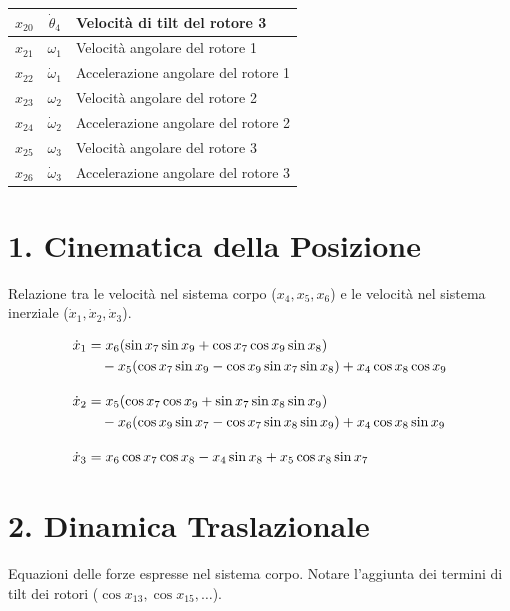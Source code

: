 \begin{table}[htbp]
\begin{tabular}{ccl}
        $x_{20}$ & $\dot{\theta}_4$ & Velocità di tilt del rotore 3 \\
        \midrule
        $x_{21}$ & $\omega_1$ & Velocità angolare del rotore 1 \\
        $x_{22}$ & $\dot{\omega}_1$ & Accelerazione angolare del rotore 1 \\
        $x_{23}$ & $\omega_2$ & Velocità angolare del rotore 2 \\
        $x_{24}$ & $\dot{\omega}_2$ & Accelerazione angolare del rotore 2 \\
        $x_{25}$ & $\omega_3$ & Velocità angolare del rotore 3 \\
        $x_{26}$ & $\dot{\omega}_3$ & Accelerazione angolare del rotore 3 \\
        \bottomrule
    \end{tabular}
\end{table}

\section*{1. Cinematica della Posizione}
Relazione tra le velocità nel sistema corpo ($x_4, x_5, x_6$) e le velocità nel sistema inerziale ($\dot{x}_1, \dot{x}_2, \dot{x}_3$).

\begin{align}
\dot{x}_1 &= x_6 (\sin x_7 \sin x_9 + \cos x_7 \cos x_9 \sin x_8) \notag \\
&\quad - x_5 (\cos x_7 \sin x_9 - \cos x_9 \sin x_7 \sin x_8) + x_4 \cos x_8 \cos x_9 \\[1em]
\dot{x}_2 &= x_5 (\cos x_7 \cos x_9 + \sin x_7 \sin x_8 \sin x_9) \notag \\
&\quad - x_6 (\cos x_9 \sin x_7 - \cos x_7 \sin x_8 \sin x_9) + x_4 \cos x_8 \sin x_9 \\[1em]
\dot{x}_3 &= x_6 \cos x_7 \cos x_8 - x_4 \sin x_8 + x_5 \cos x_8 \sin x_7
\end{align}

\section*{2. Dinamica Traslazionale}
Equazioni delle forze espresse nel sistema corpo. Notare l'aggiunta dei termini di tilt dei rotori ($\cos x_{13}, \cos x_{15}, \dots$).

